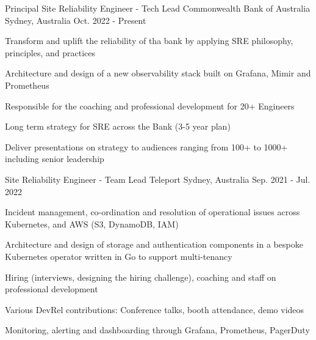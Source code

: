 

\begin{cventries}
  \cventry
    {Principal Site Reliability Engineer - Tech Lead} %
    {Commonwealth Bank of Australia} %
    {Sydney, Australia} %
    {Oct. 2022 - Present} %
    {
      \begin{cvitems} %
      \item {Transform and uplift the reliability of tha bank by applying SRE philosophy, principles, and practices} 
      \item {Architecture and design of a new observability stack built on Grafana, Mimir and Prometheus}
      \item {Responsible for the coaching and professional development for 20+ Engineers}
      \item {Long term strategy for SRE across the Bank (3-5 year plan)}
      \item {Deliver presentations on strategy to audiences ranging from 100+ to 1000+ including senior leadership}
      \end{cvitems}
    }


  \cventry
    {Site Reliability Engineer - Team Lead} %
    {Teleport} %
    {Sydney, Australia} %
    {Sep. 2021 - Jul. 2022} %
    {
      \begin{cvitems} %
      \item {Incident management, co-ordination and resolution of operational issues across Kubernetes, and AWS (S3, DynamoDB, IAM)}
        \item {Architecture and design of storage and authentication components in a bespoke Kubernetes operator written in Go to support multi-tenancy}
        \item {Hiring (interviews, designing the hiring challenge), coaching and staff on professional development}
        \item {Various DevRel contributions: Conference talks, booth attendance, demo videos }
        \item {Monitoring, alerting and dashboarding through Grafana, Prometheus, PagerDuty}
      \end{cvitems}
    }



\end{cventries}
